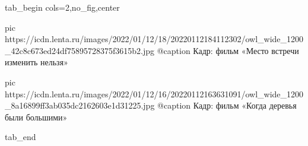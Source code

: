  
 
 
 
 


\ifcmt
  tab_begin cols=2,no_fig,center

     pic https://icdn.lenta.ru/images/2022/01/12/18/20220112184112302/owl_wide_1200_42c8c673ed24df75895728375f3615b2.jpg
		 @caption Кадр: фильм «Место встречи изменить нельзя»

		 pic https://icdn.lenta.ru/images/2022/01/12/16/20220112163631091/owl_wide_1200_8a16899ff3ab035dc2162603e1d31225.jpg
		 @caption Кадр: фильм «Когда деревья были большими»

  tab_end
\fi
